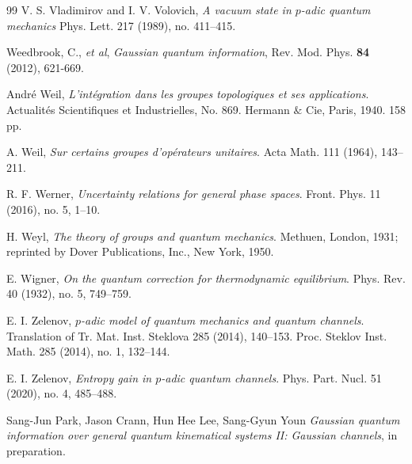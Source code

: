 \documentclass[12pt,reqno]{amsart}
\theoremstyle{definition}
\theoremstyle{definition}
\theoremstyle{definition}
\numberwithin{thm}{section}
\numberwithin{equation}{section}
\begin{document}
\begin{thebibliography}{99}
 V. S. Vladimirov and I. V. Volovich,
\textit{A vacuum state in $p$-adic quantum mechanics}
Phys. Lett. 217 (1989), no. 411--415.




Weedbrook, C., {\it et al},
{\it Gaussian quantum information},
Rev. Mod. Phys. {\bf 84} (2012), 621-669.

 Andr{\'e} Weil,
\textit{L'int{\'e}gration dans les groupes topologiques et ses applications}.
 Actualit{\'e}s Scientifiques et Industrielles, No. 869. Hermann $\&$ Cie, Paris, 1940. 158 pp.

 A. Weil,
\textit{Sur certains groupes d'op\'{e}rateurs unitaires}.
Acta Math. 111 (1964), 143--211.

R. F. Werner, 
\textit{Uncertainty relations for general phase spaces}.
Front. Phys. 11 (2016), no. 5, 1--10.

 H. Weyl,
\textit{The theory of groups and quantum mechanics}. 
Methuen, London, 1931; reprinted by Dover Publications, Inc., New York, 1950.
 
 E. Wigner,
\textit{On the quantum correction for thermodynamic equilibrium}.
Phys. Rev. 40 (1932), no. 5, 749--759. 


 E. I. Zelenov,
\textit{$p$-adic model of quantum mechanics and quantum channels}.
Translation of Tr. Mat. Inst. Steklova 285 (2014), 140--153.
Proc. Steklov Inst. Math. 285 (2014), no. 1, 132--144. 

 E. I. Zelenov,
\textit{Entropy gain in $p$-adic quantum channels}.
Phys. Part. Nucl. 51 (2020), no. 4, 485--488.


 Sang-Jun Park, Jason Crann, Hun Hee Lee, Sang-Gyun Youn
\textit{Gaussian  quantum information over general quantum kinematical systems II: Gaussian channels}, in preparation.


\end{thebibliography}
	
\end{document}
